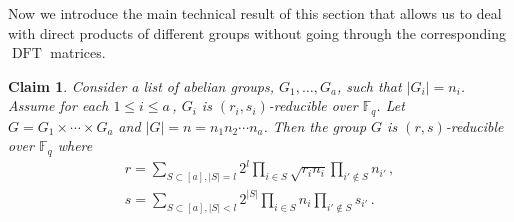 \documentclass[11pt]{article}
\numberwithin{equation}{section}
\newtheorem{claim}[theorem]{Claim}
\theoremstyle{definition}
\theoremstyle{plain}
\theoremstyle{definition}
\newcommand\F{{\mathbb{F}}}
\DeclareMathOperator{\DFT}{DFT}
\begin{document}
Now we introduce the main technical result of this section that allows us to deal with direct products of different groups without going through the corresponding $\DFT$ matrices.
\begin{claim}\label{productrigidity}
%
%
Consider a list of
abelian  %
groups, $G_1, \dots , G_a$, such that $|G_i| = n_i$.  
Assume  
for each $1 \leq i \leq a$\,, $G_i$ is $(r_i,s_i)$-reducible over $\F_q$.
Let %
$G = G_1 \times \cdots \times G_a$   %
and $|G| = n = n_1n_2 \cdots n_a$.  Then the group $G$ is $(r,s)$-reducible over $\F_q$ where 
\begin{align*}
    r = \sum_{S \subset [a], |S| = l} 2^l\prod_{i \in S} \sqrt{r_i n_i} \prod_{i' \notin S} n_{i'}\,, \\
    s = \sum_{S \subset[a], |S| < l} 2^{|S|}\prod_{i \in S} n_i \prod_{i' \notin S} s_{i'} \,.
\end{align*}
\end{claim}
\end{document}
